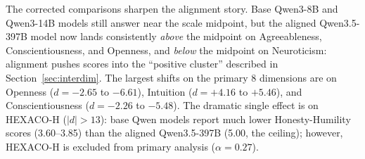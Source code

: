 \documentclass[11pt]{article}
\begin{document}
\begin{table}[!htb]
\centering
\caption{Base vs.\ aligned model comparison (Study 4) under corrected scoring. Base models lack RLHF/safety alignment; aligned models are their post-alignment counterparts from the same provider. Cohen's $d$ is reported as base minus aligned, so positive values mean the base model scores higher on that dimension. Sign-flips relative to the original paper are a direct consequence of the reverse-scoring correction.}
\label{tab:aligned_base}
\end{table}

The corrected comparisons sharpen the alignment story.
Base Qwen3-8B and Qwen3-14B models still answer near the scale midpoint, but the aligned Qwen3.5-397B model now lands consistently \emph{above} the midpoint on Agreeableness, Conscientiousness, and Openness, and \emph{below} the midpoint on Neuroticism: alignment pushes scores into the ``positive cluster'' described in Section~\ref{sec:interdim}.
The largest shifts on the primary 8 dimensions are on Openness ($d = -2.65$ to $-6.61$), Intuition ($d = +4.16$ to $+5.46$), and Conscientiousness ($d = -2.26$ to $-5.48$).
The dramatic single effect is on HEXACO-H ($|d| > 13$): base Qwen models report much lower Honesty-Humility scores (3.60--3.85) than the aligned Qwen3.5-397B (5.00, the ceiling); however, HEXACO-H is excluded from primary analysis ($\alpha = 0.27$).
\end{document}
